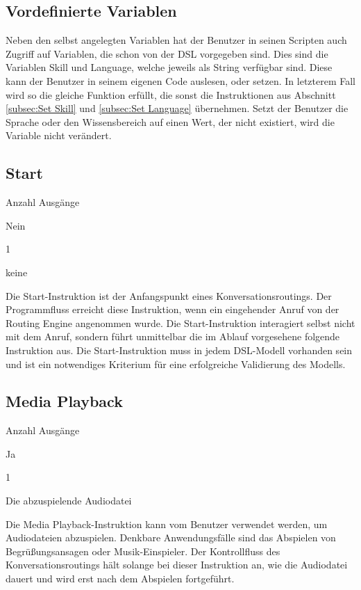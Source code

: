 \subsection{Vordefinierte Variablen}
Neben den selbst angelegten Variablen hat der Benutzer in seinen Scripten auch Zugriff auf Variablen, die schon von der DSL vorgegeben sind. Dies sind die Variablen Skill und Language, welche jeweils als String verfügbar sind. Diese kann der Benutzer in seinem eigenen Code auslesen, oder setzen. In letzterem Fall wird so die gleiche Funktion erfüllt, die sonst die Instruktionen aus Abschnitt \ref{subsec:Set Skill} und \ref{subsec:Set Language} übernehmen. Setzt der Benutzer die Sprache oder den Wissensbereich auf einen Wert, der nicht existiert, wird die Variable nicht verändert. 

\subsection{Start}
\label{subsec:start}
\begin{labeling}{Anzahl Ausgänge}
\item [Eingang] Nein
\item [Anzahl Ausgänge] 1
\item [Parameter] keine
\item [Beschreibung] Die Start-Instruktion ist der Anfangspunkt eines Konversationsroutings. Der Programmfluss erreicht diese Instruktion, wenn ein eingehender Anruf von der Routing Engine angenommen wurde. Die Start-Instruktion interagiert selbst nicht mit dem Anruf, sondern führt unmittelbar die im Ablauf vorgesehene folgende Instruktion aus. Die Start-Instruktion muss in jedem DSL-Modell vorhanden sein und ist ein notwendiges Kriterium für eine erfolgreiche Validierung des Modells. 
\end{labeling}

\subsection{Media Playback}
\label{subsec:Media Playback}
\begin{labeling}{Anzahl Ausgänge}
\item [Eingang] Ja
\item [Anzahl Ausgänge] 1
\item [Parameter] Die abzuspielende Audiodatei
\item [Beschreibung] Die Media Playback-Instruktion kann vom Benutzer verwendet werden, um Audiodateien abzuspielen. Denkbare Anwendungsfälle sind das Abspielen von Begrüßungsansagen oder Musik-Einspieler. Der Kontrollfluss des Konversationsroutings hält solange bei dieser Instruktion an, wie die Audiodatei dauert und wird erst nach dem Abspielen fortgeführt.
\end{labeling}

